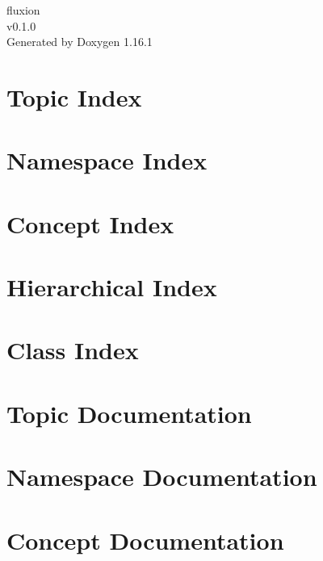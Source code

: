 \documentclass[twoside]{book}
\newcommand{\+}{\discretionary{\mbox{\scriptsize$\hookleftarrow$}}{}{}}
\newcommand{\clearemptydoublepage}{%
    \newpage{\pagestyle{empty}\cleardoublepage}%
  }
\begin{document}
  \raggedbottom
    \hypersetup{pageanchor=false,
                bookmarksnumbered=true,
                pdfencoding=unicode
               }
  \begin{titlepage}
  \vspace*{7cm}
  \begin{center}%
  {\Large fluxion}\\
  [1ex]\large v0.\+1.\+0 \\
  \vspace*{1cm}
  {\large Generated by Doxygen 1.16.1}\\
  \end{center}
  \end{titlepage}
  \clearemptydoublepage
  \tableofcontents
  \clearemptydoublepage
  \hypersetup{pageanchor=true}

\chapter{Topic Index}

\chapter{Namespace Index}

\chapter{Concept Index}

\chapter{Hierarchical Index}

\chapter{Class Index}

\chapter{Topic Documentation}


\chapter{Namespace Documentation}

\chapter{Concept Documentation}











\end{document}
